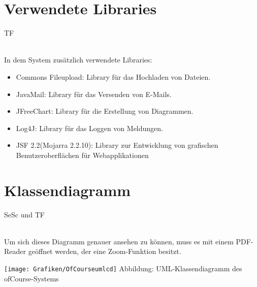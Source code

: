 	\section{Verwendete Libraries}
	\begin{tiny}
		TF\\
	\end{tiny}\\
	In dem System zusätzlich verwendete Libraries:
	\begin{itemize}
		\item Commons Fileupload: Library für das Hochladen von Dateien.
		\item JavaMail: Library für das Versenden von E-Mails.
		\item JFreeChart: Library für die Erstellung von Diagrammen.
		\item Log4J: Library für das Loggen von Meldungen.
		\item JSF 2.2(Mojarra 2.2.10): Library zur Entwicklung von grafischen Benutzeroberflächen für Webapplikationen
	\end{itemize}

	\section{Klassendiagramm}
	\begin{tiny}
		SeSc und TF\\
	\end{tiny}\\
	Um sich dieses Diagramm genauer ansehen zu können, muss es mit einem PDF-Reader
	geöffnet werden, der eine Zoom-Funktion besitzt.
	
	\begin{center}
		\texttt{[image: Grafiken/OfCourseumlcd]}
		Abbildung: UML-Klassendiagramm des ofCourse-Systems
	\end{center}


